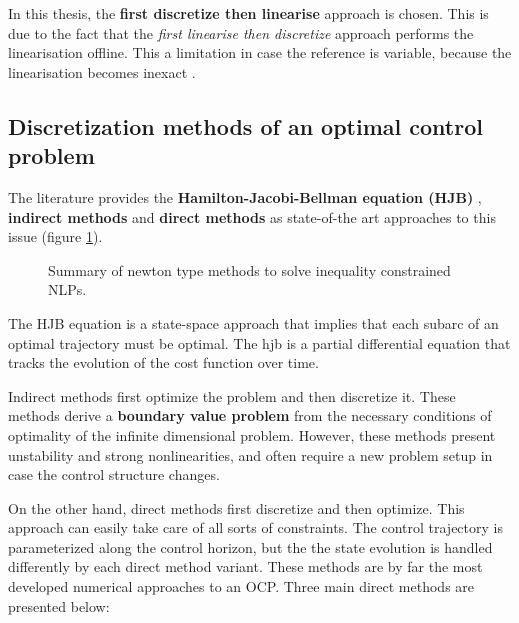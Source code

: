 In this thesis, the \textbf{first discretize then linearise} approach is chosen. This is due to the fact that the \textit{first linearise then discretize} approach performs the linearisation offline. This a limitation in case the reference is variable, because the linearisation becomes inexact \cite{gros2020linear}.

\subsection{Discretization methods of an optimal control problem}
\label{subsection:ocpdiscretization}

The literature provides the \textbf{Hamilton-Jacobi-Bellman equation (HJB)} , \textbf{indirect methods} and \textbf{direct methods} as state-of-the art approaches to this issue (figure \ref{fig:summarydiscretizationapproaches}).

\begin{figure}[h]
\centering
{}
\caption{Summary of newton type methods to solve inequality constrained NLPs.}
\label{fig:summarydiscretizationapproaches}
\end{figure}

The HJB equation is a state-space approach that implies that each subarc of an optimal trajectory must be optimal. The \acrlong{hjb} is a partial differential equation that tracks the evolution of the cost function over time.

Indirect methods first optimize the problem and then discretize it. These methods derive a \textbf{boundary value problem} from the necessary conditions of optimality of the infinite dimensional problem. However, these methods present unstability and strong nonlinearities, and often require a new problem setup in case the control structure changes.

On the other hand, direct methods first discretize and then optimize. This approach can easily take care of all sorts of constraints. The control trajectory is parameterized along the control horizon, but the the state evolution is handled differently by each direct method variant. These methods are by far the most developed numerical approaches to an OCP. Three main direct methods are presented below:

